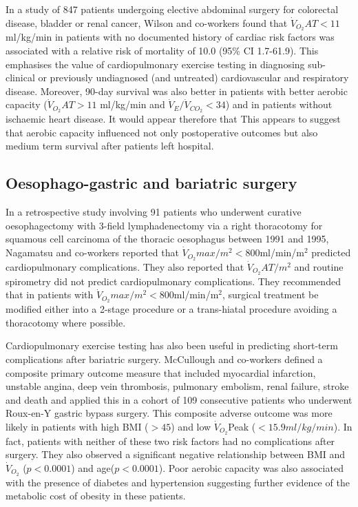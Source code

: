 In a study of 847 patients undergoing elective abdominal surgery for colorectal disease, bladder or renal cancer, Wilson and co-workers found that $\dot{V}_{O_2}AT<11$ ml/kg/min in patients with no documented history of cardiac risk factors was associated with a relative risk of mortality of 10.0 (95\% CI 1.7-61.9).\parencite{wilson_impaired_2010} This emphasises the value of cardiopulmonary exercise testing in diagnosing sub-clinical or previously undiagnosed (and untreated) cardiovascular and respiratory disease. Moreover, 90-day survival was also better in patients with better aerobic capacity ($\dot{V}_{O_2}AT>11$ ml/kg/min and $\dot{V}_E/\dot{V}_{CO_2}<34$) {a}nd in patients without ischaemic heart disease. It would appear therefore that This appears to suggest that aerobic capacity influenced not only postoperative outcomes but also medium term survival after patients left hospital.

\subsection{Oesophago-gastric and bariatric surgery}
In a retrospective study involving 91 patients who underwent curative oesophagectomy with 3-field lymphadenectomy via a
right thoracotomy for squamous cell carcinoma of the thoracic oesophagus between 1991 and 1995, Nagamatsu and co-workers reported that $\dot{V}_{O_2}max/m^2<800$ml/min/m$^2$ predicted cardiopulmonary complications.\parencite{nagamatsu_preoperative_2001} They also reported that $\dot{V}_{O_2}AT/m^2$ and routine spirometry did not predict cardiopulmonary complications. They recommended that in patients with $\dot{V}_{O_2}max/m^2<800$ml/min/m$^2$, surgical treatment be modified either into a 2-stage procedure or a trans-hiatal procedure avoiding a thoracotomy where possible.

Cardiopulmonary exercise testing has also been useful in predicting short-term complications after bariatric surgery. McCullough and co-workers defined a composite primary outcome measure that included myocardial infarction, unstable angina, deep vein thrombosis, pulmonary embolism, renal failure, stroke and death and applied this in a cohort of 109 consecutive patients who underwent Roux-en-Y gastric bypass surgery. This composite adverse outcome was more likely in patients with high BMI ($>45$) and low $\dot{V}_{O_2}$Peak ($<15.9 ml/kg/min$). In fact, patients with neither of these two risk factors had no complications after surgery. They also observed a significant negative relationship between BMI and $\dot{V}_{O_2}$ ($p<0.0001$) and age($p<0.0001$). Poor aerobic capacity was also associated with the presence of diabetes and hypertension suggesting further evidence of the metabolic cost of obesity in these patients.\parencite{mccullough_cardiorespiratory_2006}

